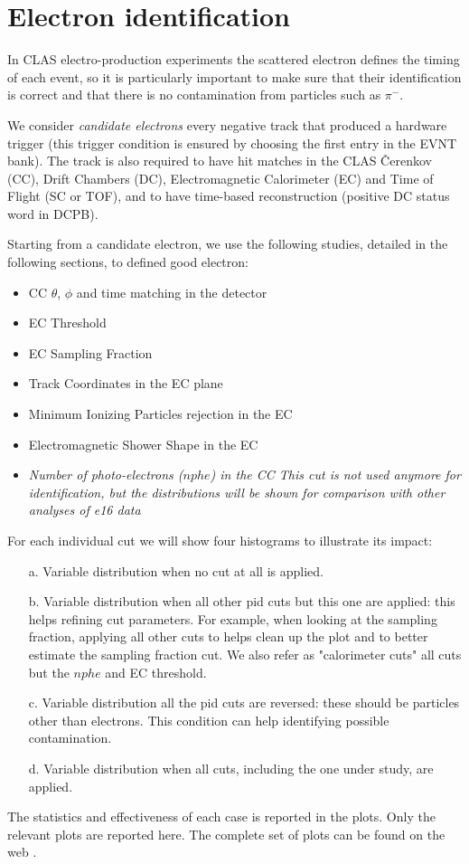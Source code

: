\clearpage\newpage


\section{Electron identification}

In CLAS electro-production experiments
the scattered electron defines the timing of each event,
so it is particularly important to
make sure that their identification is correct and that
there is no contamination from particles such as $\pi^-$.

We consider {\it candidate electrons} every negative track
that produced a hardware trigger (this trigger condition is ensured by choosing
the first entry in the EVNT bank). The track is also required to have
hit matches in the CLAS \v Cerenkov (CC)\cite{bib:cc}, Drift Chambers (DC)\cite{bib:dc},
Electromagnetic Calorimeter (EC)\cite{bib:ec} and Time of Flight (SC or TOF)\cite{bib:ftof},
and to have time-based reconstruction (positive DC status word in DCPB).

Starting from a candidate electron, we use the following studies, detailed in the following sections,
to defined good electron:

\begin{itemize}
    \item CC $\theta$, $\phi$ and time matching in the detector
    \item EC Threshold
    \item EC Sampling Fraction
    \item Track Coordinates in the EC plane
    \item Minimum Ionizing Particles rejection in the EC
    \item Electromagnetic Shower Shape in the EC
    \item {\it Number of photo-electrons ($nphe$) in the CC
    This cut is not used anymore for identification,
        but the distributions will be shown for comparison with other analyses of e16 data }
\end{itemize}

For each individual cut we will show four histograms to illustrate its impact:

\begin{itemize}
    \item[a.] Variable distribution when no cut at all is applied.
    \item[b.] Variable distribution when all other pid cuts but this one are applied:
    this helps refining cut parameters.
    For example, when looking at the sampling fraction, applying all other
    cuts to helps clean up the plot and to better estimate the sampling fraction
    cut. We also refer as "calorimeter cuts" all cuts but the $nphe$ and EC threshold.
    \item[c.] Variable distribution all the pid cuts are reversed: these should be particles other than electrons.
    This condition can help identifying possible contamination.
    \item[d.] Variable distribution when all cuts, including the one under study, are applied.
\end{itemize}

The statistics and effectiveness of each case is reported in the plots.
Only the relevant plots are reported here.
The complete set of plots can be found on the web \cite{bib:pi0_resonance_id_electron}.
